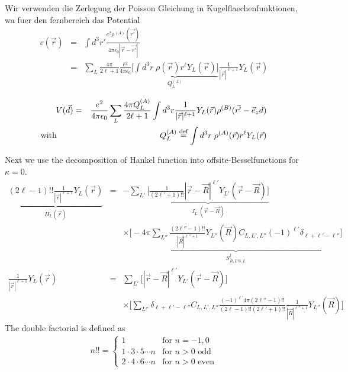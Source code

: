 \documentclass[11pt,a4paper]{report}
\begin{document}
Wir verwenden die Zerlegung der Poisson Gleichung in
Kugelflaechenfunktionen, wa fuer den fernbereich das Potential
\begin{eqnarray*}
v(\vec{r})&=&\int d^3r'\frac{e^2\rho^{(A)}(\vec{r'})}
{4\pi\epsilon_{0}|\vec{r}-\vec{r'}|}
\\
&=&\sum_L \frac{4\pi}{2\ell+1} \frac{e^2}{4\pi\epsilon_0} 
\underbrace{\biggl[\int d^3r\; \rho(\vec{r}) r^{\ell} Y_L(\vec{r})\biggr]}_{Q^{(A)}_L}
\frac{1}{|\vec{r}|^{\ell+1}}Y_L(\vec{r})
\end{eqnarray*}

\begin{eqnarray*}
V(\vec{d})&=& 
\frac{e^2}{4\pi\epsilon_0} \sum_L \frac{4\pi Q_L^{(A)}}{2\ell+1} 
\int d^3r \frac{1}{|\vec{r}|^{\ell+1}}Y_L(\vec{r})\rho^{(B)}(\vec{r'}-\vec{e}_z d)
\\
\text{with}\qquad &&
Q_L^{(A)}\stackrel{\text{def}}{=}\int d^3r\; \rho^{(A)}(\vec{r}) r^{\ell} Y_L(\vec{r})
\end{eqnarray*}

Next we use the decomposition of Hankel function into
offsite-Besselfunctions for $\kappa=0$.
\begin{eqnarray*}
\underbrace{(2\ell-1)!! \frac{1}{|\vec{r}|^{\ell+1}}Y_L(\vec{r})}_{H_L(\vec{r})}&=&
-\sum_{L'}
\underbrace{
\biggl[\frac{1}{(2\ell'+1)!!} |\vec{r}-\vec{R}|^{\ell'} Y_{L'}(\vec{r}-\vec{R})\biggr]
}_{J_{L'}(\vec{r}-\vec{R})}
\\
&&
\times\underbrace{
\biggl[-4\pi\sum_{L''}\frac{(2\ell''-1)!!}{|\vec{R}|^{\ell''+1}}Y_{L''}(\vec{R})C_{L,L',L''}
(-1)^{\ell'}\delta_{\ell+\ell'-\ell''}\biggr]
}_{S^\dagger_{R,L'0,L}}
\\
\frac{1}{|\vec{r}|^{\ell+1}}Y_L(\vec{r})&=&
\sum_{L'}
\biggl[|\vec{r}-\vec{R}|^{\ell'} Y_{L'}(\vec{r}-\vec{R})\biggr]
\\
&&
\times
\biggl[\sum_{L''}\delta_{\ell+\ell'-\ell''}C_{L,L',L''}
\frac{(-1)^{\ell'}4\pi(2\ell''-1)!!}{(2\ell-1)!!(2\ell'+1)!!}
\frac{1}{|\vec{R}|^{\ell''+1}}Y_{L''}(\vec{R})
\biggr]
\end{eqnarray*}
The double factorial is defined as
\begin{eqnarray*}
n!!=\begin{cases}
1 & \text{for $n=-1,0$}\\
1\cdot3\cdot 5\cdots n & \text{for $n>0$ odd}\\
2\cdot4\cdot 6\cdots n & \text{for $n>0$ even}
\end{cases}
\end{eqnarray*}
\end{document}
